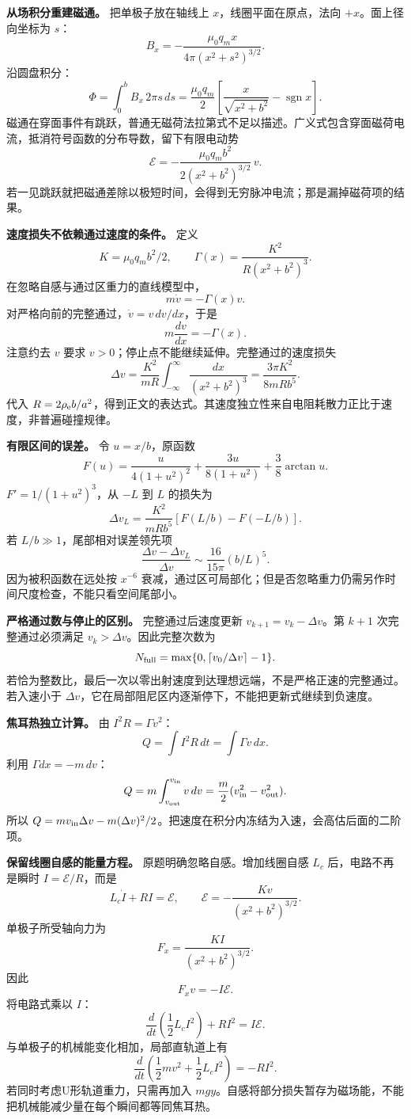 \documentclass[12pt,a4paper,UTF8]{ctexart}
\begin{document}
\textbf{从场积分重建磁通。} 把单极子放在轴线上
\(x\)，线圈平面在原点，法向 \(+x\)。面上径向坐标为 \(s\)： \[
B_x=-\frac{\mu_0q_m x}{4\pi(x^2+s^2)^{3/2}}.
\] 沿圆盘积分： \[
\Phi=\int_0^b B_x\,2\pi s\,ds
=\frac{\mu_0q_m}{2}
\left[\frac{x}{\sqrt{x^2+b^2}}-\operatorname{sgn}x\right].
\]
磁通在穿面事件有跳跃，普通无磁荷法拉第式不足以描述。广义式包含穿面磁荷电流，抵消符号函数的分布导数，留下有限电动势
\[
\mathcal E=-\frac{\mu_0q_m b^2}{2(x^2+b^2)^{3/2}}\,v.
\]
若一见跳跃就把磁通差除以极短时间，会得到无穷脉冲电流；那是漏掉磁荷项的结果。

\textbf{速度损失不依赖通过速度的条件。} 定义 \[
K=\mu_0q_m b^2/2,\qquad
\Gamma(x)=\frac{K^2}{R(x^2+b^2)^3}.
\] 在忽略自感与通过区重力的直线模型中， \[
m\dot v=-\Gamma(x)v.
\] 对严格向前的完整通过，\(\dot v=v\,dv/dx\)，于是 \[
m\frac{dv}{dx}=-\Gamma(x).
\] 注意约去 \(v\) 要求 \(v>0\)；停止点不能继续延伸。完整通过的速度损失
\[
\Delta v=\frac{K^2}{mR}\int_{-\infty}^{\infty}
\frac{dx}{(x^2+b^2)^3}
=\frac{3\pi K^2}{8mRb^5}.
\] 代入
\(R=2\rho_{\rm e}b/a^2\)，得到正文的表达式。其速度独立性来自电阻耗散力正比于速度，非普遍碰撞规律。

\textbf{有限区间的误差。} 令 \(u=x/b\)，原函数 \[
F(u)=\frac{u}{4(1+u^2)^2}
+\frac{3u}{8(1+u^2)}
+\frac38\arctan u.
\] \(F'=1/(1+u^2)^3\)，从 \(-L\) 到 \(L\) 的损失为 \[
\Delta v_L=\frac{K^2}{mRb^5}
[F(L/b)-F(-L/b)].
\] 若 \(L/b\gg1\)，尾部相对误差领先项 \[
\frac{\Delta v-\Delta v_L}{\Delta v}
\sim\frac{16}{15\pi}(b/L)^5.
\] 因为被积函数在远处按 \(x^{-6}\)
衰减，通过区可局部化；但是否忽略重力仍需另作时间尺度检查，不能只看空间尾部小。

\textbf{严格通过数与停止的区别。} 完整通过后速度更新
\(v_{k+1}=v_k-\Delta v\)。第 \(k+1\) 次完整通过必须满足
\(v_k>\Delta v\)。因此完整次数为 \[
N_{\rm full}=\max\{0,\lceil v_0/\Delta v\rceil-1\}.
\]
若恰为整数比，最后一次以零出射速度到达理想远端，不是严格正速的完整通过。若入速小于
\(\Delta v\)，它在局部阻尼区内逐渐停下，不能把更新式继续到负速度。

\textbf{焦耳热独立计算。} 由 \(I^2R=\Gamma v^2\)： \[
Q=\int I^2R\,dt=\int\Gamma v\,dx.
\] 利用 \(\Gamma dx=-m\,dv\)： \[
Q=m\int_{v_{\rm out}}^{v_{\rm in}}v\,dv
=\frac m2(v_{\rm in}^2-v_{\rm out}^2).
\] 所以
\(Q=m v_{\rm in}\Delta v-m(\Delta v)^2/2\)。把速度在积分内冻结为入速，会高估后面的二阶项。

\textbf{保留线圈自感的能量方程。} 原题明确忽略自感。增加线圈自感 \(L_c\)
后，电路不再是瞬时 \(I=\mathcal E/R\)，而是 \[
L_c\dot I+RI=\mathcal E,\qquad
\mathcal E=-\frac{Kv}{(x^2+b^2)^{3/2}}.
\] 单极子所受轴向力为 \[
F_x=\frac{KI}{(x^2+b^2)^{3/2}}.
\] 因此 \[
F_xv=-I\mathcal E.
\] 将电路式乘以 \(I\)： \[
\frac d{dt}\left(\frac12L_cI^2\right)+RI^2=I\mathcal E.
\] 与单极子的机械能变化相加，局部直轨道上有 \[
\boxed{\frac d{dt}
\left(\frac12mv^2+\frac12L_cI^2\right)=-RI^2}.
\] 若同时考虑U形轨道重力，只需再加入
\(mgy\)。自感将部分损失暂存为磁场能，不能把机械能减少量在每个瞬间都等同焦耳热。
\end{document}
